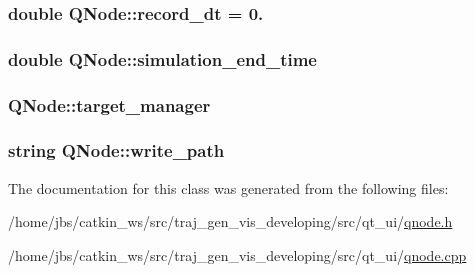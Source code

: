 \subsubsection[{\texorpdfstring{record\+\_\+dt}{record_dt}}]{\setlength{\rightskip}{0pt plus 5cm}double Q\+Node\+::record\+\_\+dt = 0.}\hypertarget{class_q_node_ad1f3252201b932fc5d39b4f80349c7e2}{}\label{class_q_node_ad1f3252201b932fc5d39b4f80349c7e2}
\subsubsection[{\texorpdfstring{simulation\+\_\+end\+\_\+time}{simulation_end_time}}]{\setlength{\rightskip}{0pt plus 5cm}double Q\+Node\+::simulation\+\_\+end\+\_\+time}\hypertarget{class_q_node_a7a127726e48aa5bde733d715af7a744c}{}\label{class_q_node_a7a127726e48aa5bde733d715af7a744c}
\subsubsection[{\texorpdfstring{target\+\_\+manager}{target_manager}}]{ Q\+Node\+::target\+\_\+manager}\hypertarget{class_q_node_adc66765125dfd755d5e7f0c0eb6e6395}{}\label{class_q_node_adc66765125dfd755d5e7f0c0eb6e6395}
\subsubsection[{\texorpdfstring{write\+\_\+path}{write_path}}]{\setlength{\rightskip}{0pt plus 5cm}string Q\+Node\+::write\+\_\+path}\hypertarget{class_q_node_a0967d1922eeb7e39eedca309c7003d23}{}\label{class_q_node_a0967d1922eeb7e39eedca309c7003d23}


The documentation for this class was generated from the following files\+:\begin{DoxyCompactItemize}
\item 
/home/jbs/catkin\+\_\+ws/src/traj\+\_\+gen\+\_\+vis\+\_\+developing/src/qt\+\_\+ui/\hyperlink{qnode_8h}{qnode.\+h}\item 
/home/jbs/catkin\+\_\+ws/src/traj\+\_\+gen\+\_\+vis\+\_\+developing/src/qt\+\_\+ui/\hyperlink{qnode_8cpp}{qnode.\+cpp}\end{DoxyCompactItemize}
